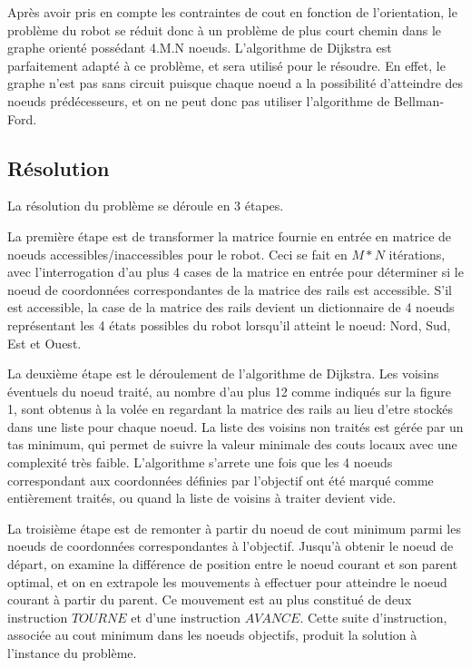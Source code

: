 \documentclass{article}
\begin{document}
Après avoir pris en compte les contraintes de cout en fonction de l'orientation, le problème du robot se réduit donc à un problème de plus court chemin dans le graphe orienté possédant {4.M.N} noeuds. L'algorithme de Dijkstra est parfaitement adapté à ce problème, et sera utilisé pour le résoudre. En effet, le graphe n'est pas sans circuit puisque chaque noeud a la possibilité d'atteindre des noeuds prédécesseurs, et on ne peut donc pas utiliser l'algorithme de Bellman-Ford.

\subsection{Résolution}
La résolution du problème se déroule en 3 étapes.

La première étape est de transformer la matrice fournie en entrée en matrice de noeuds accessibles/inaccessibles pour le robot. Ceci se fait en $M*N$ itérations, avec l'interrogation d'au plus 4 cases de la matrice en entrée pour déterminer si le noeud de coordonnées correspondantes de la matrice des rails est accessible. S'il est accessible, la case de la matrice des rails devient un dictionnaire de 4 noeuds représentant les 4 états possibles du robot lorsqu'il atteint le noeud: Nord, Sud, Est et Ouest.

La deuxième étape est le déroulement de l'algorithme de Dijkstra. Les voisins éventuels du noeud traité, au nombre d'au plus 12 comme indiqués sur la figure 1, sont obtenus à la volée en regardant la matrice des rails au lieu d'etre stockés dans une liste pour chaque noeud. La liste des voisins non traités est gérée par un tas minimum, qui permet de suivre la valeur minimale des couts locaux avec une complexité très faible. L'algorithme s'arrete une fois que les 4 noeuds correspondant aux coordonnées définies par l'objectif ont été marqué comme entièrement traités, ou quand la liste de voisins à traiter devient vide.

La troisième étape est de remonter à partir du noeud de cout minimum parmi les noeuds de coordonnées correspondantes à l'objectif. Jusqu'à obtenir le noeud de départ, on examine la différence de position entre le noeud courant et son parent optimal, et on en extrapole les mouvements à effectuer pour atteindre le noeud courant à partir du parent. Ce mouvement est au plus constitué de deux instruction $TOURNE$ et d'une instruction $AVANCE$. Cette suite d'instruction, associée au cout minimum dans les noeuds objectifs, produit la solution à l'instance du problème.
\end{document}
